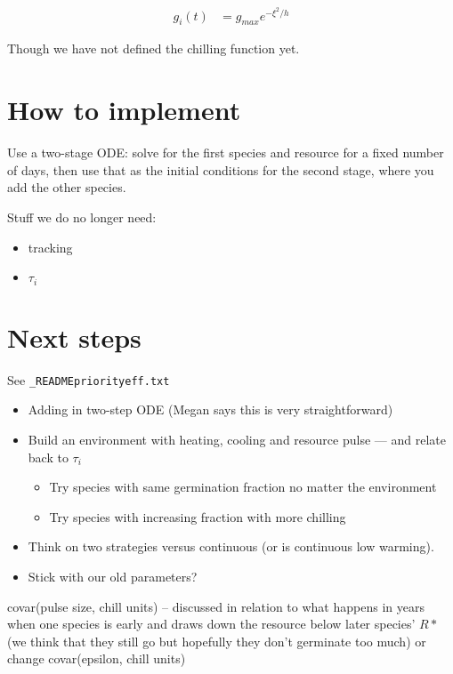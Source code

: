 \documentclass[11pt,letter]{article}
\begin{document}
\begin{align}
g_i(t) & = g_{max}e^{-\xi^2/h}
\end{align}

Though we have not defined the chilling function yet. 



\section{How to implement} 

Use a two-stage ODE: solve for the first species and resource for a fixed number of days, then use that as the initial conditions for the second stage, where you add the other species.


Stuff we do no longer need:\\
\begin{itemize}
\item tracking
\item $\tau_i$
\end{itemize}

\section{Next steps}

See \verb|_READMEpriorityeff.txt|

\begin{itemize}
\item Adding in two-step ODE (Megan says this is very straightforward)
\item  Build an environment with heating, cooling and resource pulse — and relate back to $\tau_i$
\begin{itemize}
\item Try species with same germination fraction no matter the environment
\item Try species with increasing fraction with more chilling 
\end{itemize}
\item Think on two strategies versus continuous (or is continuous low warming).
\item Stick with our old parameters? 
\end{itemize}

covar(pulse size, chill units) -- discussed in relation to what happens in years when one species is early and draws down the resource below later species' $R*$ (we think that they still go but hopefully they don't germinate too much) or change covar(epsilon, chill units)\\
\end{document}

